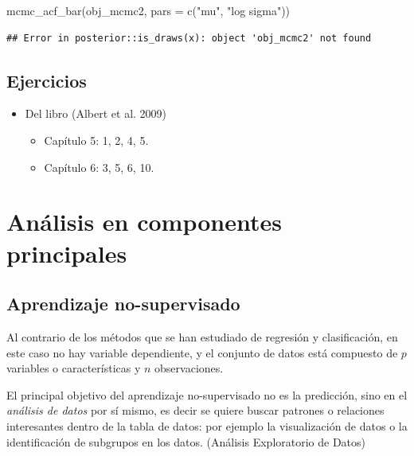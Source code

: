 \documentclass[
  12pt,
]{book}
\newenvironment{Shaded}{\begin{snugshade}}{\end{snugshade}}
\newcommand{\AttributeTok}[1]{\textcolor[rgb]{0.77,0.63,0.00}{#1}}
\newcommand{\FunctionTok}[1]{\textcolor[rgb]{0.00,0.00,0.00}{#1}}
\newcommand{\NormalTok}[1]{#1}
\newcommand{\StringTok}[1]{\textcolor[rgb]{0.31,0.60,0.02}{#1}}
\providecommand{\tightlist}{%
  \setlength{\itemsep}{0pt}\setlength{\parskip}{0pt}}
\begin{document}
\begin{Shaded}
\begin{Highlighting}[]
\FunctionTok{mcmc\_acf\_bar}\NormalTok{(obj\_mcmc2, }\AttributeTok{pars =} \FunctionTok{c}\NormalTok{(}\StringTok{"mu"}\NormalTok{, }\StringTok{"log sigma"}\NormalTok{))}
\end{Highlighting}
\end{Shaded}

\begin{verbatim}
## Error in posterior::is_draws(x): object 'obj_mcmc2' not found
\end{verbatim}

\hypertarget{ejercicios-6}{%
\section{Ejercicios}\label{ejercicios-6}}

\begin{itemize}
\tightlist
\item
  Del libro (Albert et al. 2009)

  \begin{itemize}
  \tightlist
  \item
    Capítulo 5: 1, 2, 4, 5.
  \item
    Capítulo 6: 3, 5, 6, 10.
  \end{itemize}
\end{itemize}

\hypertarget{anuxe1lisis-en-componentes-principales}{%
\chapter{Análisis en componentes
principales}\label{anuxe1lisis-en-componentes-principales}}

\hypertarget{aprendizaje-no-supervisado}{%
\section{Aprendizaje no-supervisado}\label{aprendizaje-no-supervisado}}

Al contrario de los métodos que se han estudiado de regresión y
clasificación, en este caso no hay variable dependiente, y el conjunto
de datos está compuesto de \(p\) variables o características y \(n\)
observaciones.

El principal objetivo del aprendizaje no-supervisado no es la
predicción, sino en el \emph{análisis de datos} por sí mismo, es decir
se quiere buscar patrones o relaciones interesantes dentro de la tabla
de datos: por ejemplo la visualización de datos o la identificación de
subgrupos en los datos. (Análisis Exploratorio de Datos)
\end{document}
